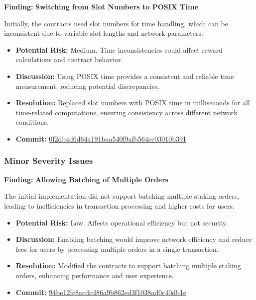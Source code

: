 \documentclass{article}
\begin{document}
\begin{moderatebox}
\textbf{Finding:} \textbf{Switching from Slot Numbers to POSIX Time}

Initially, the contracts used slot numbers for time handling, which can be inconsistent due to variable slot lengths and network parameters.

\begin{itemize}[label=$\diamond$]
    \item \textbf{Potential Risk:} Medium. Time inconsistencies could affect reward calculations and contract behavior.
    \item \textbf{Discussion:} Using POSIX time provides a consistent and reliable time measurement, reducing potential discrepancies.
    \item \textbf{Resolution:} Replaced slot numbers with POSIX time in milliseconds for all time-related computations, ensuring consistency across different network conditions.
    \item \textbf{Commit:} \href{https://github.com/MuesliSwapTeam/muesliswap-decentralized-farming/commit/0f2db4d6d64a191baa540f9afb564cc03010b391}{0f2db4d6d64a191baa540f9afb564cc03010b391}
\end{itemize}
\end{moderatebox}

\subsubsection{Minor Severity Issues}

\begin{minorbox}
\textbf{Finding:} \textbf{Allowing Batching of Multiple Orders}

The initial implementation did not support batching multiple staking orders, leading to inefficiencies in transaction processing and higher costs for users.

\begin{itemize}[label=$\diamond$]
    \item \textbf{Potential Risk:} Low. Affects operational efficiency but not security.
    \item \textbf{Discussion:} Enabling batching would improve network efficiency and reduce fees for users by processing multiple orders in a single transaction.
    \item \textbf{Resolution:} Modified the contracts to support batching multiple staking orders, enhancing performance and user experience.
    \item \textbf{Commit:} \href{https://github.com/MuesliSwapTeam/muesliswap-decentralized-farming/commit/94be12fc8acdcd86a9b862ed3f1038ad0c40db1e}{94be12fc8acdcd86a9b862ed3f1038ad0c40db1e}
\end{itemize}
\end{minorbox}
\end{document}
